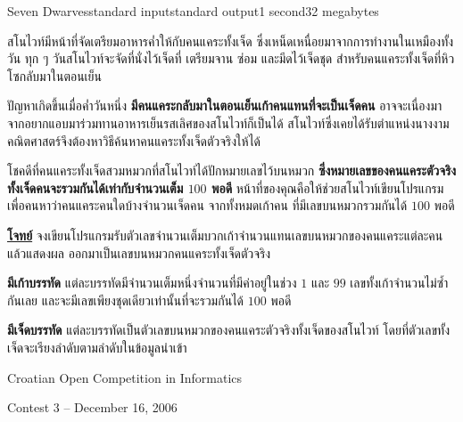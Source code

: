 \documentclass[11pt,a4paper]{article}
\begin{document}
\begin{problem}{Seven Dwarves}{standard input}{standard output}{1 second}{32 megabytes}

สโนไวท์มีหน้าที่จัดเตรียมอาหารค่ำให้กับคนแคระทั้งเจ็ด ซึ่งเหน็ดเหนื่อยมาจากการทำงานในเหมืองทั้งวัน ทุก ๆ วันสโนไวท์จะจัดที่นั่งไว้เจ็ดที่ เตรียมจาน ซ่อม และมีดไว้เจ็ดชุด สำหรับคนแคระทั้งเจ็ดที่หิวโซกลับมาในตอนเย็น

ปัญหาเกิดขึ้นเมื่อค่ำวันหนึ่ง \textbf{มีคนแคระกลับมาในตอนเย็นเก้าคนแทนที่จะเป็นเจ็ดคน} อาจจะเนื่องมาจากอยากแอบมาร่วมทานอาหารเย็นรสเลิศของสโนไวท์ก็เป็นได้ สโนไวท์ซึ่งเคยได้รับตำแหน่งนางงามคณิตศาสตร์จึงต้องหาวิธีค้นหาคนแคระทั้งเจ็ดตัวจริงให้ได้

โชคดีที่คนแคระทั้งเจ็ดสวมหมวกที่สโนไวท์ได้ปักหมายเลขไว้บนหมวก \textbf{ซึ่งหมายเลขของคนแคระตัวจริงทั้งเจ็ดคนจะรวมกันได้เท่ากับจำนวนเต็ม $100$ พอดี } หน้าที่ของคุณคือให้ช่วยสโนไวท์เขียนโปรแกรมเพื่อคนหาว่าคนแคระคนใดบ้างจำนวนเจ็ดคน จากทั้งหมดเก้าคน ที่มีเลขบนหมวกรวมกันได้ $100$ พอดี


\underline{\textbf{โจทย์}} จงเขียนโปรแกรมรับตัวเลขจำนวนเต็มบวกเก้าจำนวนแทนเลขบนหมวกของคนแคระแต่ละคน แล้วแสดงผล ออกมาเป็นเลขบนหมวกคนแคระทั้งเจ็ดตัวจริง

\InputFile

\textbf{มีเก้าบรรทัด} แต่ละบรรทัดมีจำนวนเต็มหนึ่งจำนวนที่มีค่าอยู่ในช่วง $1$ และ $99$ เลขทั้งเก้าจำนวนไม่ซ้ำกันเลย และจะมีเลขเพียงชุดเดียวเท่านั้นที่จะรวมกันได้ $100$ พอดี

\OutputFile

\textbf{มีเจ็ดบรรทัด} แต่ละบรรทัดเป็นตัวเลขบนหมวกของคนแคระตัวจริงทั้งเจ็ดของสโนไวท์ โดยที่ตัวเลขทั้งเจ็ดจะเรียงลำดับตามลำดับในข้อมูลนำเข้า

\Examples

\begin{example}
%
%
\end{example}

\Source

Croatian Open Competition in Informatics

Contest 3 – December 16, 2006

\end{problem}
\end{document}
